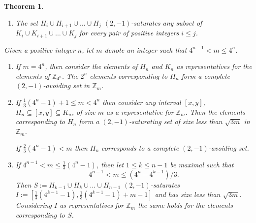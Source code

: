 \documentclass[11pt]{article}
\numberwithin{table}{section}
\newtheorem{theorem}{Theorem}[section]
\theoremstyle{definition}
\begin{document}
	\begin{theorem}
		\label{gyok3} \ \\ \vspace{-0.8cm}
		\begin{enumerate}[\rm(1)]
			\item The set $H_i \cup H_{i+1} \cup \ldots \cup H_{j}$ $(2,-1)$-saturates any subset of $K_i \cup K_{i+1} \cup \ldots \cup K_{j}$ for every pair of positive integers $i\leq j$.
		\end{enumerate}
		
		
		
		Given a positive integer $n$, let $m$ denote an integer such that $4^{n-1} < m \leq 4^n$.
		
		\begin{enumerate}[\rm(2)]
			\item If $m=4^n$, then consider the elements of $H_n$ and $K_n$ as representatives for the elements of $\mathbb{Z}_{4^n}$. The $2^n$ elements corresponding to $H_n$ form a complete $(2,-1)$-avoiding set in $\mathbb{Z}_m$.
			
			
			
			\item[\rm(3)] If $\frac13(4^n-1)+1\leq m<4^n$ then consider any interval $[x,y]$,  $H_n \subseteq [x,y] \subseteq K_n$, of size $m$ as a representative for $\mathbb{Z}_m$. Then the elements corresponding to $H_n$ form a $(2,-1)$-saturating set of size less than $\sqrt{3 m}$ in $\mathbb{Z}_m$.
			
			If $\frac23(4^n-1) < m$ then $H_n$ corresponds to a complete $(2,-1)$-avoiding set.
			
			\item[\rm(4)] If $4^{n-1}<m\leq \frac13(4^n-1)$, then let $1\leq k\leq n-1$ be maximal such that 
			\[4^{n-1}< m \leq (4^n-4^{k-1})/3.\]
			Then $S:=H_{k-1} \cup H_{k}\cup \ldots \cup H_{n-1}$ $(2,-1)$-saturates $I:=[\frac13(4^{k-1}-1),\frac13(4^{k-1}-1)+m-1]$ and has size less than $\sqrt{3m}$. Considering $I$ as representatives for $\mathbb{Z}_m$ the same holds for the elements corresponding to $S$. 
		\end{enumerate}
		
	\end{theorem}
\end{document}
